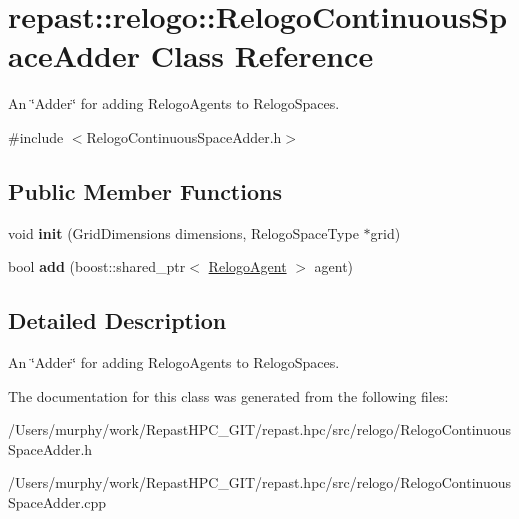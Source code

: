 \hypertarget{classrepast_1_1relogo_1_1_relogo_continuous_space_adder}{\section{repast\-:\-:relogo\-:\-:Relogo\-Continuous\-Space\-Adder Class Reference}
\label{classrepast_1_1relogo_1_1_relogo_continuous_space_adder}
}


An \char`\"{}\-Adder\char`\"{} for adding Relogo\-Agents to Relogo\-Spaces.  




{\ttfamily \#include $<$Relogo\-Continuous\-Space\-Adder.\-h$>$}

\subsection*{Public Member Functions}
\begin{DoxyCompactItemize}
\item 
\hypertarget{classrepast_1_1relogo_1_1_relogo_continuous_space_adder_ae3d1f3a8f4b28aaf125a2f958cd9d93d}{void {\bfseries init} (Grid\-Dimensions dimensions, Relogo\-Space\-Type $\ast$grid)}\label{classrepast_1_1relogo_1_1_relogo_continuous_space_adder_ae3d1f3a8f4b28aaf125a2f958cd9d93d}

\item 
\hypertarget{classrepast_1_1relogo_1_1_relogo_continuous_space_adder_a1f01bacbabf806b87c75c3a2c0631b48}{bool {\bfseries add} (boost\-::shared\-\_\-ptr$<$ \hyperlink{classrepast_1_1relogo_1_1_relogo_agent}{Relogo\-Agent} $>$ agent)}\label{classrepast_1_1relogo_1_1_relogo_continuous_space_adder_a1f01bacbabf806b87c75c3a2c0631b48}

\end{DoxyCompactItemize}


\subsection{Detailed Description}
An \char`\"{}\-Adder\char`\"{} for adding Relogo\-Agents to Relogo\-Spaces. 

The documentation for this class was generated from the following files\-:\begin{DoxyCompactItemize}
\item 
/\-Users/murphy/work/\-Repast\-H\-P\-C\-\_\-\-G\-I\-T/repast.\-hpc/src/relogo/Relogo\-Continuous\-Space\-Adder.\-h\item 
/\-Users/murphy/work/\-Repast\-H\-P\-C\-\_\-\-G\-I\-T/repast.\-hpc/src/relogo/Relogo\-Continuous\-Space\-Adder.\-cpp\end{DoxyCompactItemize}
